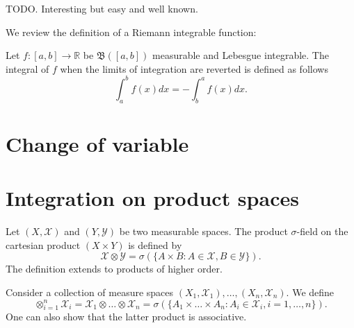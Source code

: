 \begin{definition}[]
    \label{def:9.4}
    TODO. Interesting but easy and well known.
\end{definition}

We review the definition of a Riemann integrable function:
\begin{definition}[title]
    \label{def:title}
    
\end{definition}

\begin{definition}[]
    \label{def:9.6}
    Let $f:\left[ a,b \right] \to \mathbb{R} $ be $\mathfrak{B}(\left[ a,b \right] ) $ measurable and
    Lebesgue integrable. The integral of $f $ when the limits of integration are reverted is defined
    as follows
    \[
    \int_{a}^{b}f(x)dx = - \int_{b}^{a}f(x)dx
    .\] 
\end{definition}

\section{Change of variable}%
\label{sec:Change of variable}

\section{Integration on product spaces}%
\label{sec:Integration on product spaces}

\begin{definition}
    \label{def:9.9}
    Let $(X, \mathscr{X})$ and $(Y, \mathscr{Y})$ be two measurable spaces. The product
    $\sigma$-field on the cartesian product $(X \times Y)$ is defined by
    \[
    \mathscr{X} \otimes \mathscr{Y} = \sigma(\{A\times B: A \in \mathscr{X}, B \in \mathscr{Y}\} )
    .\] 
    The definition extends to products of higher order. 

    Consider a collection of measure spaces $(X_1, \mathscr{X}_1), \ldots, (X_n, \mathscr{X}_n)$. We define
    \[
    \otimes_{i=1}^{n}\mathscr{X}_i = \mathscr{X}_1 \otimes \ldots \otimes \mathscr{X}_n
    = \sigma(\{A_1\times \ldots\times A_n: A_i \in \mathscr{X}_i, i =1, \ldots, n\} )
    .\] 
    One can also show that the latter product is associative.
\end{definition}
